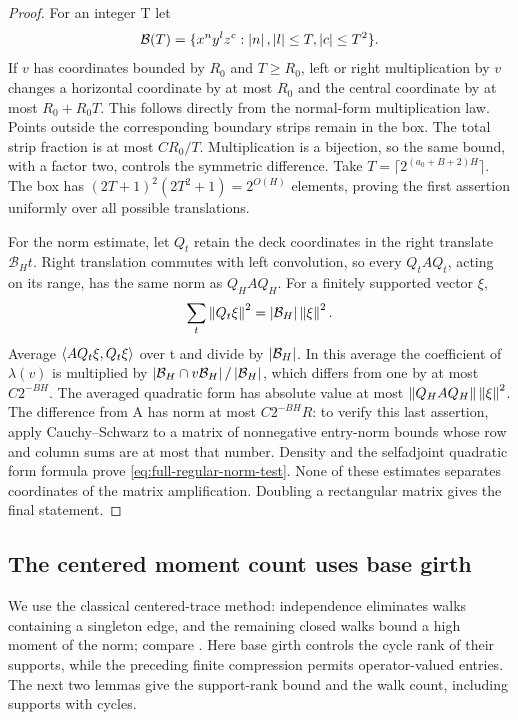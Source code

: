\begin{proof}
For an integer T let
\[
 \mathcal B(T)=\{x^ny^lz^c:\left\lvert n\right\rvert,\left\lvert l\right\rvert\leq T, \left\lvert c\right\rvert\leq T^2\}.
\]
If \(v\) has coordinates bounded by \(R_0\) and \(T\geq R_0\), left or right
multiplication by \(v\) changes a horizontal coordinate by at most \(R_0\) and the
central coordinate by at most \(R_0+R_0T\).  This follows directly from the
normal-form multiplication law.  Points outside the corresponding boundary
strips remain in the box.  The total strip fraction is at most \(C R_0/T\).
Multiplication is a bijection, so the same bound, with a factor two, controls
the symmetric difference.  Take
\(T=\lceil2^{(a_0+B+2)H}\rceil\).  The box has
\((2T+1)^2(2T^2+1)=2^{O(H)}\) elements, proving the first assertion uniformly
over all possible translations.

For the norm estimate, let \(Q_t\) retain the deck coordinates in the right
translate \(\mathcal B_Ht\).  Right translation commutes with left convolution,
so every \(Q_tAQ_t\), acting on its range, has the same norm as \(Q_HAQ_H\).
For a finitely supported vector \(\xi\),
\[
 \sum_t\left\lVert Q_t\xi\right\rVert^2=\left\lvert\mathcal B_H\right\rvert\left\lVert\xi\right\rVert^2.
\]
Average \(\left\langle AQ_t\xi,Q_t\xi\right\rangle\) over t and divide by
\(\left\lvert\mathcal B_H\right\rvert\).  In this average the coefficient of \(\lambda(v)\)
is multiplied by \(\left\lvert\mathcal B_H\cap v\mathcal B_H\right\rvert/\left\lvert\mathcal B_H\right\rvert\),
which differs from one by at most \(C2^{-BH}\).  The averaged quadratic form
has absolute value at most \(\left\lVert Q_HAQ_H\right\rVert\left\lVert\xi\right\rVert^2\).  The difference
from A has norm at most \(C2^{-BH}R\): to verify this last assertion, apply
Cauchy--Schwarz to a matrix of nonnegative entry-norm bounds whose row and
column sums are at most that number.  Density and the selfadjoint quadratic
form formula prove \eqref{eq:full-regular-norm-test}.  None of these estimates
separates coordinates of the matrix amplification.  Doubling a rectangular
matrix gives the final statement.
\end{proof}

\subsection{The centered moment count uses base girth}

We use the classical centered-trace method: independence eliminates walks
containing a singleton edge, and the remaining closed walks bound a high
moment of the norm; compare \cite[Sections~3.1--3.3]{FK81}.  Here base girth
controls the cycle rank of their supports, while the preceding finite
compression permits operator-valued entries.  The next two lemmas give the
support-rank bound and the walk count, including supports with cycles.

